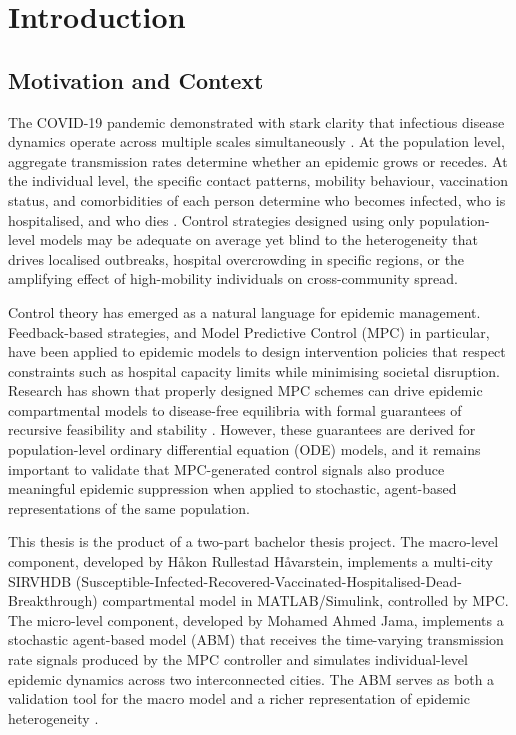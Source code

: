 

\chapter{Introduction}
\label{ch:intro}

\section{Motivation and Context}
\label{sec:motivation}

The COVID-19 pandemic demonstrated with stark clarity that infectious disease dynamics operate across multiple scales simultaneously \citep{dong2022,mathieu2020}.
At the population level, aggregate transmission rates determine whether an epidemic grows or recedes.
At the individual level, the specific contact patterns, mobility behaviour, vaccination status, and comorbidities of each person determine who becomes infected, who is hospitalised, and who dies \citep{zhang2021}.
Control strategies designed using only population-level models may be adequate on average yet blind to the heterogeneity that drives localised outbreaks, hospital overcrowding in specific regions, or the amplifying effect of high-mobility individuals on cross-community spread.

Control theory has emerged as a natural language for epidemic management.
Feedback-based strategies, and Model Predictive Control (MPC) in particular, have been applied to epidemic models to design intervention policies that respect constraints such as hospital capacity limits while minimising societal disruption.
Research has shown that properly designed MPC schemes can drive epidemic compartmental models to disease-free equilibria with formal guarantees of recursive feasibility and stability \citep{esterhuizen2024}.
However, these guarantees are derived for population-level ordinary differential equation (ODE) models, and it remains important to validate that MPC-generated control signals also produce meaningful epidemic suppression when applied to stochastic, agent-based representations of the same population.

This thesis is the product of a two-part bachelor thesis project.
The macro-level component, developed by H\aa{}kon Rullestad H\aa{}varstein, implements a multi-city SIRVHDB (Susceptible-Infected-Recovered-Vaccinated-Hospitalised-Dead-Breakthrough) compartmental model in MATLAB/Simulink, controlled by MPC.
The micro-level component, developed by Mohamed Ahmed Jama, implements a stochastic agent-based model (ABM) that receives the time-varying transmission rate signals produced by the MPC controller and simulates individual-level epidemic dynamics across two interconnected cities.
The ABM serves as both a validation tool for the macro model and a richer representation of epidemic heterogeneity \citep{polcz2025,zhang2025}.

